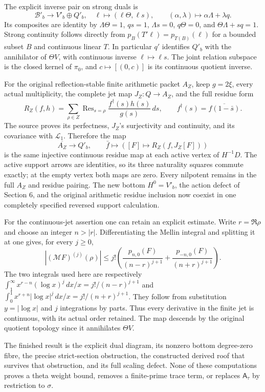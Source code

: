 \documentclass[
  11pt,
]{article}
\begin{document}
The explicit inverse pair on strong duals is \[
\mathscr B'_b\longrightarrow V'_b\oplus Q'_b,\quad
\ell\longmapsto(\ell\Theta,\ell s),
\qquad
(\alpha,\lambda)\longmapsto\alpha\Lambda+\lambda q.
\] Its composites are identity by \(\Lambda\Theta=1\), \(qs=1\),
\(\Lambda s=0\), \(q\Theta=0\), and \(\Theta\Lambda+sq=1\). Strong
continuity follows directly from \(p_B(T'\ell)=p_{T(B)}(\ell)\) for a
bounded subset \(B\) and continuous linear \(T\). In particular \(q'\)
identifies \(Q'_b\) with the annihilator of \(\Theta V\), with
continuous inverse \(\ell\mapsto\ell s\). The joint relation subspace is
the closed kernel of \(\pi_0\), and \(c\mapsto[(0,c)]\) is its
continuous quotient inverse.

For the original reflection-stable finite arithmetic packet \(A_Z\),
keep \(g=2\xi\), every actual multiplicity, the complete jet map
\(J_Z:Q\to A_Z\), and the full residue form \[
R_Z(f,h)=\sum_{\rho\in Z}\operatorname{Res}_{s=\rho}
\frac{f^\dagger(s)h(s)}{g(s)}\,ds,
\qquad f^\dagger(s)=\overline{f(1-\bar s)}.
\] The source proves its perfectness, \(J_Z\)'s surjectivity and
continuity, and its covariance with \(\mathcal L_1\). Therefore the map
\[
\overline{A_Z}\longrightarrow Q'_b,
\qquad\bar f\longmapsto([F]\mapsto R_Z(f,J_Z[F]))
\] is the same injective continuous residue map at each active vertex of
\(H^{-1}D\). The active support arrows are identities, so its three
naturality squares commute exactly; at the empty vertex both maps are
zero. Every nilpotent remains in the full \(A_Z\) and residue pairing.
The new bottom \(H^0=V'_b\), the action defect of Section 6, and the
original arithmetic residue inclusion now coexist in one completely
specified reversed support calculation.

For the continuous-jet assertion one can retain an explicit estimate.
Write \(r=\Re\rho\) and choose an integer \(n>|r|\). Differentiating the
Mellin integral and splitting it at one gives, for every \(j\ge0\), \[
|(\mathcal MF)^{(j)}(\rho)|
\le j!\left(
\frac{p_{n,0}(F)}{(n-r)^{j+1}}+
\frac{p_{-n,0}(F)}{(n+r)^{j+1}}\right).
\] The two integrals used here are respectively
\(\int_1^\infty x^{r-n}(\log x)^j\,dx/x=j!/(n-r)^{j+1}\) and
\(\int_0^1x^{r+n}|\log x|^j\,dx/x=j!/(n+r)^{j+1}\). They follow from
substitution \(y=|\log x|\) and \(j\) integrations by parts. Thus every
derivative in the finite jet is continuous, with its actual order
retained. The map descends by the original quotient topology since it
annihilates \(\Theta V\).

The finished result is the explicit dual diagram, its nonzero bottom
degree-zero fibre, the precise strict-section obstruction, the
constructed derived roof that survives that obstruction, and its full
scaling defect. None of these computations proves a theta weight bound,
removes a finite-prime trace term, or replaces \(\mathsf A_\tau\) by
restriction to \(\sigma\).
\end{document}
